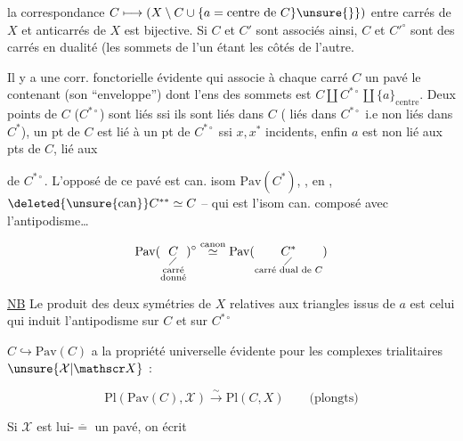 la correspondance $C\longmapsto(X\setminus C\cup\{a=\text{centre de }C\}\unsure{\}})$ entre carrés de $X$ et anticarrés de $X$ est bijective. Si $C$ et $C'$ sont associés ainsi, $C$ et $C'^\circ$ sont des carrés en dualité (les sommets de l'un étant les côtés de l'autre.

Il y a une corr. fonctorielle évidente qui associe à chaque carré $C$ un pavé  le contenant (son ``enveloppe'') dont l'ens des sommets est $C\amalg C^{*\circ}\amalg\{a\}_{\text{centre}}$. Deux points de $C$ ($C^{*\circ}$) sont liés ssi ils sont liés dans $C$ ( liés dans $C^{*\circ}$ i.e non liés dans $C^*$), un pt  de $C$ est lié à un pt  de $C^{*\circ}$ ssi  $x,x^*$ incidents, enfin $a$ est non lié aux pts de $C$, lié aux


de $C^{*\circ}$. L'opposé de ce pavé  est can. isom   $\mathrm{Pav}(C^*)$,  , en  ,  $\deleted{\unsure{\text{can}}}C^{**}\simeq C$ -- qui est l'isom can. composé avec l'antipodisme\ldots

\[
\mathrm{Pav}(\underset{\substack{\diagup\\\text{carré}\\\text{donné}}}{C})^\circ
\overset{\text{canon}}{\simeq}
\mathrm{Pav}(\underset{\substack{\diagup\\\text{carré dual de }C}}{C^*})
\]

\uline{NB} Le produit des deux symétries de $X$ relatives aux triangles issus de $a$ est celui qui   induit l'antipodisme sur $C$ et sur $C^{*\circ}$

$C\hookrightarrow\mathrm{Pav}(C)$ a la propriété universelle évidente pour les complexes trialitaires $\unsure{\mathcal X|\mathscr X}$ :

\[
\mathrm{Pl}(\mathrm{Pav}(C),\mathcal X)\xrightarrow{\sim}\mathrm{Pl}(C,X)\qquad\text{(plongts)}
\]

Si $\mathcal X$ est lui-$\overline{=}$ un pavé, on écrit

